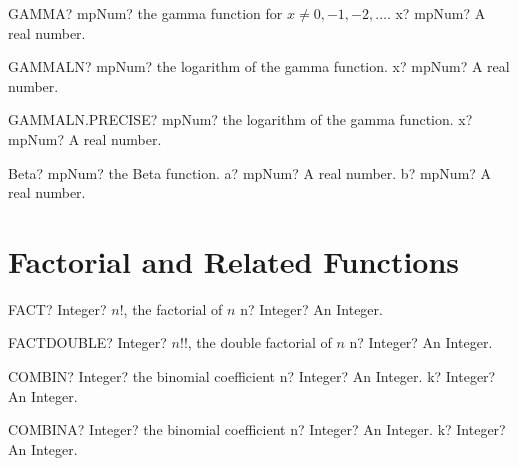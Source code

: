 \documentclass[12pt,a4paper,openany]{book}
\begin{document}
\begin{mpFunctionsExtract}
\mpWorksheetFunctionOneNotImplemented
{GAMMA? mpNum? the gamma function for $x \neq 0, -1, -2,\ldots$.}
{x? mpNum? A real number.}
\end{mpFunctionsExtract}

\begin{mpFunctionsExtract}
\mpWorksheetFunctionOneNotImplemented
{GAMMALN? mpNum? the logarithm of the gamma function.}
{x? mpNum? A real number.}
\end{mpFunctionsExtract}

\begin{mpFunctionsExtract}
\mpWorksheetFunctionOneNotImplemented
{GAMMALN.PRECISE? mpNum? the logarithm of the gamma function.}
{x? mpNum? A real number.}
\end{mpFunctionsExtract}

\begin{mpFunctionsExtract}
\mpFunctionTwoNotImplemented
{Beta? mpNum? the Beta function.}
{a? mpNum? A real number.}
{b? mpNum? A real number.}
\end{mpFunctionsExtract}

\section{Factorial and Related Functions}

\begin{mpFunctionsExtract}
\mpWorksheetFunctionOneNotImplemented
{FACT? Integer?  $n!$, the factorial of $n$}
{n? Integer? An Integer.}
\end{mpFunctionsExtract}

\begin{mpFunctionsExtract}
\mpWorksheetFunctionOneNotImplemented
{FACTDOUBLE? Integer?  $n!!$, the double factorial of $n$}
{n? Integer? An Integer.}
\end{mpFunctionsExtract}

\begin{mpFunctionsExtract}
\mpWorksheetFunctionTwoNotImplemented
{COMBIN? Integer? the binomial coefficient}
{n? Integer? An Integer.}
{k? Integer? An Integer.}
\end{mpFunctionsExtract}

\begin{mpFunctionsExtract}
\mpWorksheetFunctionTwoNotImplemented
{COMBINA? Integer? the binomial coefficient}
{n? Integer? An Integer.}
{k? Integer? An Integer.}
\end{mpFunctionsExtract}
\end{document}
